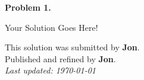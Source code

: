 ﻿\documentclass[12pt]{article}
\begin{document}
	
	\textbf{Problem 1.\\}
	
	Your Solution Goes Here!
	
	\newpage
	\thispagestyle{empty}
	
	\begin{center}
		This solution was submitted by \textbf{Jon}.\\[4pt]
		Published and refined by \textbf{Jon}.\\[8pt]
		\textit{Last updated: \today}
	\end{center}
	
\end{document}
